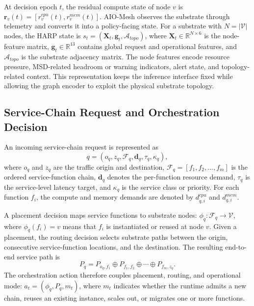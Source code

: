 \documentclass[final,5p]{elsarticle}
\begin{document}
At decision epoch \(t\), the residual compute state of node \(v\) is $\mathbf{r}_v(t)=\left[r_v^{cpu}(t),r_v^{mem}(t)\right]$.
AIO-Mesh observes the substrate through telemetry and converts it into a policy-facing state. For a substrate with \(N=|\mathcal{V}|\) nodes, the HARP state is $s_t = \left(\mathbf{X}_t,\mathbf{g}_t,\mathcal{A}_{topo}\right)$,
where \(\mathbf{X}_t\in\mathbb{R}^{N\times 6}\) is the node-feature matrix, \(\mathbf{g}_t\in\mathbb{R}^{13}\) contains global request and operational features, and \(\mathcal{A}_{topo}\) is the substrate adjacency matrix. The node features encode resource pressure, MSD-related headroom or warning indicators, alert state, and topology-related context. This representation keeps the inference interface fixed while allowing the graph encoder to exploit the physical substrate topology.

\subsection{Service-Chain Request and Orchestration Decision}
\label{subsec:sfc_model}

An incoming service-chain request is represented as
\begin{equation}
    q=(o_q,z_q,\mathcal{F}_q,\mathbf{d}_q,\tau_q,\kappa_q),
\end{equation}
where \(o_q\) and \(z_q\) are the traffic origin and destination, \(\mathcal{F}_q=[f_1,f_2,\ldots,f_m]\) is the ordered service-function chain, \(\mathbf{d}_q\) denotes the per-function resource demand, \(\tau_q\) is the service-level latency target, and \(\kappa_q\) is the service class or priority. For each function \(f_i\), the compute and memory demands are denoted by \(d_{q,i}^{cpu}\) and \(d_{q,i}^{mem}\).

A placement decision maps service functions to substrate nodes: $\phi_q:\mathcal{F}_q\rightarrow\mathcal{V}$,
where \(\phi_q(f_i)=v\) means that \(f_i\) is instantiated or reused at node \(v\). Given a placement, the routing decision selects substrate paths between the origin, consecutive service-function locations, and the destination. The resulting end-to-end service path is
\begin{equation}
    P_q = P_{o_q,f_1}
        \oplus P_{f_1,f_2}
        \oplus \cdots
        \oplus P_{f_m,z_q}.        
\end{equation}
The orchestration action therefore couples placement, routing, and operational mode: $a_t = \left(\phi_q,P_q,m_t\right)$,
where \(m_t\) indicates whether the runtime admits a new chain, reuses an existing instance, scales out, or migrates one or more functions.
\end{document}
